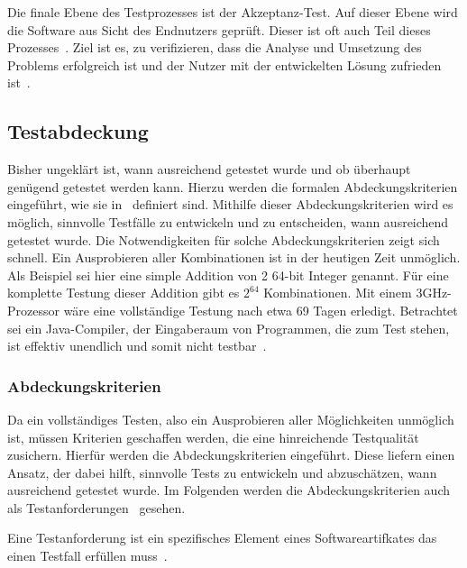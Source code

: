 Die finale Ebene des Testprozesses ist der Akzeptanz-Test.
Auf dieser Ebene wird die Software aus Sicht des Endnutzers geprüft.
Dieser ist oft auch Teil dieses Prozesses~\cite[vgl. S.6]{software-testing}.
Ziel ist es, zu verifizieren, dass die Analyse und Umsetzung des Problems erfolgreich ist und der Nutzer mit der entwickelten Lösung
zufrieden ist~\cite[vgl. S.6]{software-testing}.

\subsection{Testabdeckung}
\label{abdeck}

Bisher ungeklärt ist, wann ausreichend getestet wurde und ob überhaupt genügend getestet werden kann.
Hierzu werden die formalen Abdeckungskriterien eingeführt, wie sie in~\cite{software-testing} definiert sind.
Mithilfe dieser Abdeckungskriterien wird es möglich, sinnvolle Testfälle zu entwickeln und zu entscheiden, wann ausreichend getestet wurde.
Die Notwendigkeiten für solche Abdeckungskriterien zeigt sich schnell.
Ein Ausprobieren aller Kombinationen ist in der heutigen Zeit unmöglich.
Als Beispiel sei hier eine simple Addition von 2 64-bit Integer genannt.
Für eine komplette Testung dieser Addition gibt es $2^{64}$ Kombinationen.
Mit einem 3GHz-Prozessor wäre eine vollständige Testung nach etwa 69 Tagen erledigt.
Betrachtet sei ein Java-Compiler, der Eingaberaum von Programmen, die zum Test stehen, ist effektiv unendlich und somit nicht testbar~\cite[vgl. 1.3 Coverage Criteria for Testing]{software-testing}.

\subsubsection{Abdeckungskriterien}

Da ein vollständiges Testen, also ein Ausprobieren aller Möglichkeiten unmöglich ist, müssen Kriterien geschaffen werden, die eine hinreichende Testqualität zusichern.
Hierfür werden die Abdeckungskriterien eingeführt.
Diese liefern einen Ansatz, der dabei hilft, sinnvolle Tests zu entwickeln und abzuschätzen, wann ausreichend getestet wurde.
Im Folgenden werden die Abdeckungskriterien auch als Testanforderungen~\cite[vgl. 1.3 Coverage Criteria for Testing]{software-testing} gesehen.

\begin{definition}
    Eine Testanforderung ist ein spezifisches Element eines Softwareartifkates das einen Testfall erfüllen muss~\cite[Def. 1.20]{software-testing}.
    \label{tr}
\end{definition}

